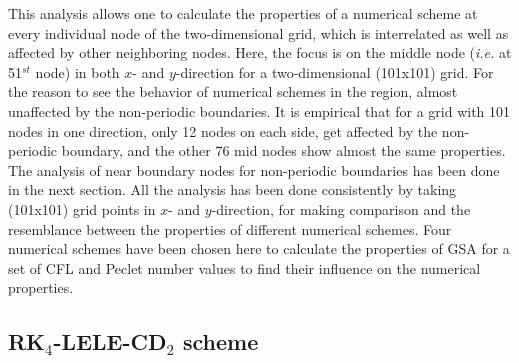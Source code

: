 \documentclass[showpacs,preprintnumbers,amsmath,amssymb]{revtex4-1} %
\begin{document}
This analysis allows one to calculate the properties of a numerical scheme at every individual node of the two-dimensional grid, which is interrelated as well as affected by other neighboring nodes. Here, the focus is on the middle node (\textit{i.e.} at 51$^{st}$ node) in both $x$- and $y$-direction for a two-dimensional (101x101) grid. For the reason to see the behavior of numerical schemes in the region, almost unaffected by the non-periodic boundaries. It is empirical that for a grid with 101 nodes in one direction, only 12 nodes on each side, get affected by the non-periodic boundary, and the other 76 mid nodes show almost the same properties. The analysis of near boundary nodes for non-periodic boundaries has been done in the next section. All the analysis has been done consistently by taking (101x101) grid points in $x$- and $y$-direction, for making comparison and the resemblance between the properties of different numerical schemes. Four numerical schemes have been chosen here to calculate the properties of GSA for a set of CFL and Peclet number values to find their influence on the numerical properties.

\subsection{RK$_4$-LELE-CD$_2$ scheme}
\end{document}
